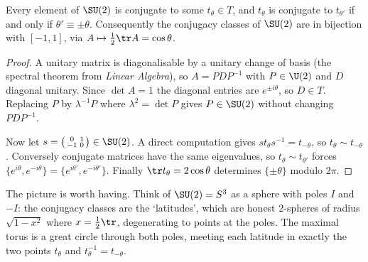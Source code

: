 \begin{proposition}
	Every element of $\SU(2)$ is conjugate to some $t_\theta \in T$, and $t_\theta$ is conjugate to $t_{\theta'}$ if and only if $\theta' \equiv\pm\theta$. Consequently the conjugacy classes of $\SU(2)$ are in bijection with $[-1,1]$, via $A\mapsto\frac12\tr A = \cos\theta$.
\end{proposition}
\begin{proof}
	A unitary matrix is diagonalisable by a unitary change of basis (the spectral theorem from \emph{Linear Algebra}), so $A = PDP^{-1}$ with $P\in\U(2)$ and $D$ diagonal unitary. Since $\det A = 1$ the diagonal entries are $e^{\pm i\theta}$, so $D\in T$. Replacing $P$ by $\lambda^{-1}P$ where $\lambda^2 = \det P$ gives $P\in\SU(2)$ without changing $PDP^{-1}$.

	Now let $s = \left(\begin{smallmatrix}0&1\\-1&0\end{smallmatrix}\right)\in\SU(2)$. A direct computation gives $st_\theta s^{-1} = t_{-\theta}$, so $t_\theta\sim t_{-\theta}$. Conversely conjugate matrices have the same eigenvalues, so $t_\theta\sim t_{\theta'}$ forces $\{e^{i\theta},e^{-i\theta}\} = \{e^{i\theta'},e^{-i\theta'}\}$. Finally $\tr t_\theta = 2\cos\theta$ determines $\{\pm\theta\}$ modulo $2\pi$.
\end{proof}

The picture is worth having. Think of $\SU(2) = S^3$ as a sphere with poles $I$ and $-I$: the conjugacy classes are the `latitudes', which are honest $2$-spheres of radius $\sqrt{1-x^2}$ where $x = \frac12\tr$, degenerating to points at the poles. The maximal torus is a great circle through both poles, meeting each latitude in exactly the two points $t_\theta$ and $t_\theta^{-1} = t_{-\theta}$.

\begin{center}
\end{center}
\vspace{0.4em}

